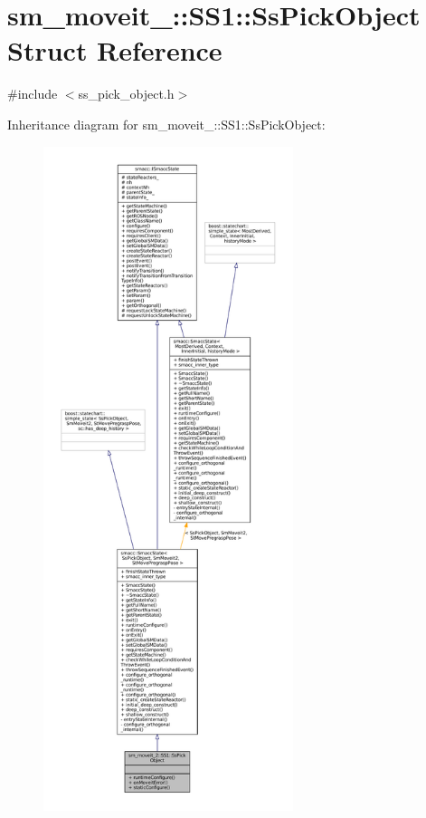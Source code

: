 \hypertarget{structsm__moveit__2_1_1SS1_1_1SsPickObject}{}\section{sm\+\_\+moveit\+\_\+:\+:S\+S1\+:\+:Ss\+Pick\+Object Struct Reference}
\label{structsm__moveit__2_1_1SS1_1_1SsPickObject}


{\ttfamily \#include $<$ss\+\_\+pick\+\_\+object.\+h$>$}



Inheritance diagram for sm\+\_\+moveit\+\_\+:\+:S\+S1\+:\+:Ss\+Pick\+Object\+:
\nopagebreak
\begin{figure}[H]
\begin{center}
\leavevmode
\includegraphics[height=550pt]{structsm__moveit__2_1_1SS1_1_1SsPickObject__inherit__graph}
\end{center}
\end{figure}



